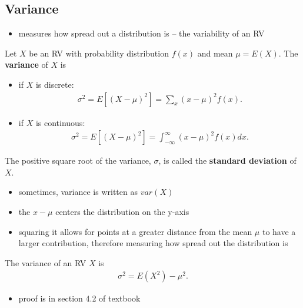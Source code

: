 \documentclass[10pt]{article}
\begin{document}
\subsection{Variance}
\begin{itemize}
    \item measures how spread out a distribution is -- the variability of an RV
\end{itemize}
\begin{definition}
    Let $X$ be an RV with probability distribution $f(x)$ and mean $\mu = E(X)$. The \textbf{variance} of $X$ is
    \begin{itemize}
        \item if $X$ is discrete:
            \begin{align*}
                \sigma^2 = E[(X-\mu)^2] = \sum_{x} (x-\mu)^2 f(x)
            .\end{align*}
        \item if $X$ is continuous:
            \begin{align*}
                \sigma^2 = E[(X-\mu)^2] = \int_{-\infty}^{\infty} (x-\mu)^2 f(x) dx 
            .\end{align*}
    \end{itemize} 
    The positive square root of the variance, $\sigma$, is called the \textbf{standard deviation} of $X$.
\end{definition}
\begin{itemize}
    \item sometimes, variance is written as $var(X)$
    \item the $x-\mu$ centers the distribution on the y-axis
    \item squaring it allows for points at a greater distance from the mean $\mu$ to have a larger contribution, therefore measuring how spread out the distribution is
\end{itemize}
\begin{theorem}
    The variance of an RV $X$ is
    \begin{align*}
        \sigma^2 = E(X^2) - \mu^2
    .\end{align*}
    \begin{itemize}
        \item proof is in section 4.2 of textbook
    \end{itemize}
\end{theorem}
\end{document}
